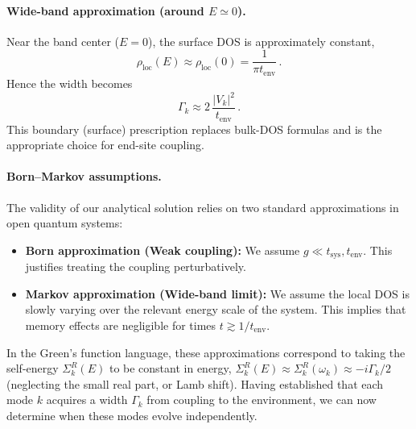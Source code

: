 \documentclass[12pt,oneside,openright]{report}
\theoremstyle{definition}
\theoremstyle{plain}
\theoremstyle{remark}
\begin{document}
\paragraph{Wide-band approximation (around $E\simeq 0$).}
Near the band center ($E=0$), the surface DOS is approximately constant,
\begin{equation}
 \rho_{\mathrm{loc}}(E) \approx \rho_{\mathrm{loc}}(0) = \frac{1}{\pi t_{\mathrm{env}}}\,.
 \label{eq:rho_loc_0}
\end{equation}
Hence the width becomes
\begin{equation}
 \Gamma_k \approx 2\,\frac{|V_k|^2}{t_{\mathrm{env}}}\,.
 \label{eq:Gamma_wide_band}
\end{equation}
This boundary (surface) prescription replaces bulk-DOS formulas and is the appropriate choice for end-site coupling.

\paragraph{Born–Markov assumptions.}
The validity of our analytical solution relies on two standard approximations in open quantum systems:
\begin{itemize}
    \item \textbf{Born approximation (Weak coupling):} We assume $g \ll t_{\mathrm{sys}}, t_{\mathrm{env}}$. This justifies treating the coupling perturbatively.
    \item \textbf{Markov approximation (Wide-band limit):} We assume the local DOS is slowly varying over the relevant energy scale of the system. This implies that memory effects are negligible for times $t \gtrsim 1/t_{\mathrm{env}}$.
\end{itemize}
In the Green's function language, these approximations correspond to taking the self-energy $\Sigma_k^{R}(E)$ to be constant in energy, $\Sigma_k^{R}(E) \approx \Sigma_k^{R}(\omega_k) \approx -i\Gamma_k/2$ (neglecting the small real part, or Lamb shift).
Having established that each mode $k$ acquires a width $\Gamma_k$ from coupling to the environment, we can 
now determine when these modes evolve independently.
\end{document}
